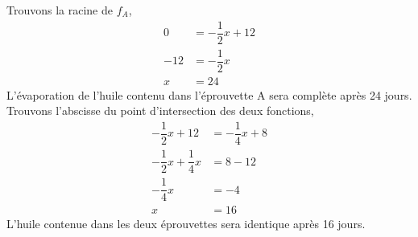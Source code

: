     \begin{tasks}
        \task Trouvons la racine de $f_A$,
        \begin{align*}
            0   & =-\dfrac{1}{2}x+12 \\
            -12 & = -\dfrac{1}{2}x   \\
            x   & = 24
        \end{align*}
        L'évaporation de l'huile contenu dans l'éprouvette A sera complète après 24 jours.
        \task Trouvons l'abscisse du point d'intersection des deux fonctions,
        \begin{align*}
            -\dfrac{1}{2}x+12              & = -\dfrac{1}{4}x+8 \\
            -\dfrac{1}{2}x + \dfrac{1}{4}x & = 8 -12            \\
            -\dfrac{1}{4}x                 & = -4               \\
            x                              & = 16
        \end{align*}
        L'huile contenue dans les deux éprouvettes sera identique après 16 jours.
    \end{tasks}
